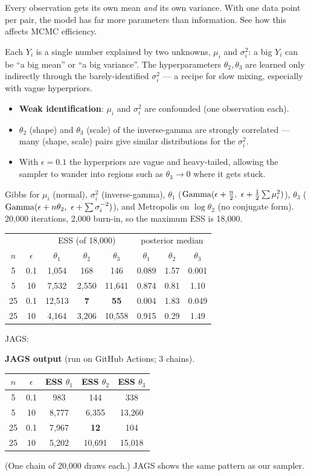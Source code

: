 \documentclass[11pt]{article}
\newenvironment{jagsbox}{\begin{sanity}\small\textbf{JAGS output} (run on GitHub Actions; 3 chains).\par\smallskip\centering}{\end{sanity}}
\newcommand{\JAGSexnineteen}{\begin{jagsbox}
\begin{tabular}{cc|ccc}\toprule
$n$ & $\epsilon$ & ESS $\theta_1$ & ESS $\theta_2$ & ESS $\theta_3$\\\midrule
5 & 0.1 & 983 & 144 & 338\\
5 & 10 & 8{,}777 & 6{,}355 & 13{,}260\\
25 & 0.1 & 7{,}967 & \textbf{12} & 104\\
25 & 10 & 5{,}202 & 10{,}691 & 15{,}018\\\bottomrule
\end{tabular}\par\smallskip
(One chain of 20{,}000 draws each.) JAGS shows the same pattern as our sampler.
\end{jagsbox}}
\begin{document}
\begin{restate}
Every observation gets its own mean \emph{and} its own variance. With one data point per pair, the model has far more parameters than information. See how this affects MCMC efficiency.
\end{restate}

\begin{keyidea}
Each $Y_i$ is a single number explained by two unknowns, $\mu_i$ and $\sigma_i^2$: a big $Y_i$ can be ``a big mean'' or ``a big variance''. The hyperparameters $\theta_2,\theta_3$ are learned only indirectly through the barely-identified $\sigma_i^2$ --- a recipe for slow mixing, especially with vague hyperpriors.
\end{keyidea}

\solution
{}
\begin{itemize}
\item \textbf{Weak identification}: $\mu_i$ and $\sigma_i^2$ are confounded (one observation each).
\item $\theta_2$ (shape) and $\theta_3$ (scale) of the inverse-gamma are strongly correlated --- many (shape, scale) pairs give similar distributions for the $\sigma_i^2$.
\item With $\epsilon=0.1$ the hyperpriors are vague and heavy-tailed, allowing the sampler to wander into regions such as $\theta_3\to0$ where it gets stuck.
\end{itemize}

 Gibbs for $\mu_i$ (normal), $\sigma_i^2$ (inverse-gamma), $\theta_1$ ($\dist{Gamma}(\epsilon+\frac n2,\ \epsilon+\frac12\sum\mu_i^2)$), $\theta_3$ ($\dist{Gamma}(\epsilon+n\theta_2,\ \epsilon+\sum\sigma_i^{-2})$), and Metropolis on $\log\theta_2$ (no conjugate form). 20{,}000 iterations, 2{,}000 burn-in, so the maximum ESS is 18{,}000.

\begin{center}
\begin{tabular}{cc|ccc|ccc}\toprule
 & & \multicolumn{3}{c|}{ESS (of 18{,}000)} & \multicolumn{3}{c}{posterior median}\\
$n$ & $\epsilon$ & $\theta_1$ & $\theta_2$ & $\theta_3$ & $\theta_1$ & $\theta_2$ & $\theta_3$\\\midrule
5 & 0.1 & 1{,}054 & 168 & 146 & 0.089 & 1.57 & 0.001\\
5 & 10 & 7{,}532 & 2{,}550 & 11{,}641 & 0.874 & 0.81 & 1.10\\
25 & 0.1 & 12{,}513 & \textbf{7} & \textbf{55} & 0.004 & 1.83 & 0.049\\
25 & 10 & 4{,}164 & 3{,}206 & 10{,}558 & 0.915 & 0.29 & 1.49\\\bottomrule
\end{tabular}
\end{center}
JAGS:
\JAGSexnineteen
\end{document}
